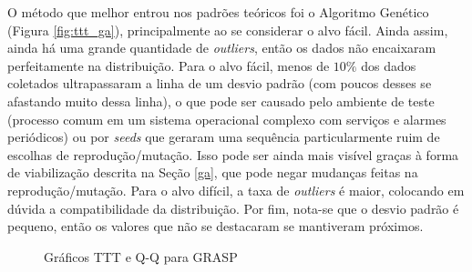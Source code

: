 \documentclass{MO824}
\begin{document}
O método que melhor entrou nos padrões teóricos foi o Algoritmo Genético (Figura \ref{fig:ttt_ga}), principalmente ao se considerar o alvo fácil. Ainda assim, ainda há uma grande quantidade de \textit{outliers}, então os dados não encaixaram perfeitamente na distribuição. Para o alvo fácil, menos de $10\%$ dos dados coletados ultrapassaram a linha de um desvio padrão (com poucos desses se afastando muito dessa linha), o que pode ser causado pelo ambiente de teste (processo comum em um sistema operacional complexo com serviços e alarmes periódicos) ou por \textit{seeds} que geraram uma sequência particularmente ruim de escolhas de reprodução/mutação. Isso pode ser ainda mais visível graças à forma de viabilização descrita na Seção \ref{ga}, que pode negar mudanças feitas na reprodução/mutação. Para o alvo difícil, a taxa de \textit{outliers} é maior, colocando em dúvida a compatibilidade da distribuição. Por fim, nota-se que o desvio padrão é pequeno, então os valores que não se destacaram se mantiveram próximos.

\begin{figure}
    \centering
    \caption{Gráficos TTT e Q-Q para GRASP}
    \label{fig:ttt_grasp}
\end{figure}
\end{document}
